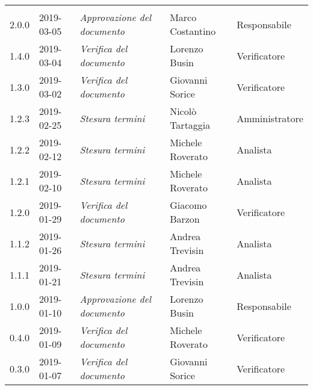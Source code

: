 \newpage 
\section*{}
	\begin{longtable}{C{2cm}|C{2.5cm}|C{4.5cm}|C{2.5cm}|C{3cm}}
		
		 &  &  &  &   \\
		\endhead
	
		 2.0.0 & 2019-03-05 & \emph{Approvazione del documento} & Marco Costantino & Responsabile  \\
		\hline
		
		1.4.0 & 2019-03-04 & \emph{Verifica del documento} & Lorenzo Busin & Verificatore \\
		\hline
		
		1.3.0 & 2019-03-02 & \emph{Verifica del documento} & Giovanni Sorice & Verificatore \\
		\hline
	
		1.2.3 & 2019-02-25 & \emph{Stesura termini} & Nicolò Tartaggia & Amministratore \\
		\hline
	
		1.2.2 & 2019-02-12 & \emph{Stesura termini} & Michele Roverato & Analista \\
		\hline
	
		1.2.1 & 2019-02-10 & \emph{Stesura termini} & Michele Roverato & Analista \\
		\hline
	
		1.2.0 & 2019-01-29 & \emph{Verifica del documento} & Giacomo Barzon & Verificatore \\
		\hline
	
		1.1.2 & 2019-01-26 & \emph{Stesura termini} & Andrea Trevisin & Analista \\
		\hline
	
		1.1.1 & 2019-01-21 & \emph{Stesura termini} & Andrea Trevisin & Analista \\
		\hline
		
		1.0.0 & 2019-01-10 & \emph{Approvazione del documento} & Lorenzo Busin & Responsabile \\
		\hline
		
		0.4.0 & 2019-01-09 & \emph{Verifica del documento} & Michele Roverato & Verificatore \\
		\hline
		
		0.3.0 & 2019-01-07 & \emph{Verifica del documento} & Giovanni Sorice & Verificatore \\
		\hline
		

\end{longtable}
